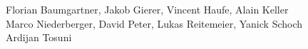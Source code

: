 %
%
%
Florian Baumgartner,	%
Jakob Gierer,		%
Vincent Haufe,		%
Alain Keller		%
\\
Marco Niederberger,	%
David Peter,		%
Lukas Reitemeier,	%
Yanick Schoch		%
\\
Ardijan Tosuni		%
